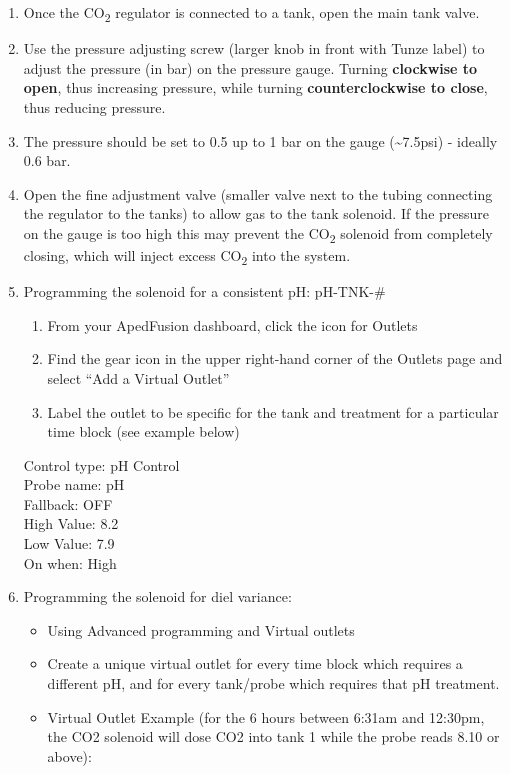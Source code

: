 \documentclass[
]{book}
\providecommand{\tightlist}{%
  \setlength{\itemsep}{0pt}\setlength{\parskip}{0pt}}
\begin{document}
\begin{enumerate}
\def\labelenumi{\arabic{enumi}.}
\item
  Once the CO\textsubscript{2} regulator is connected to a tank, open the main tank valve.
\item
  Use the pressure adjusting screw (larger knob in front with Tunze label) to adjust the pressure (in bar) on the pressure gauge. Turning \textbf{clockwise to open}, thus increasing pressure, while turning \textbf{counterclockwise to close}, thus reducing pressure.
\item
  The pressure should be set to 0.5 up to 1 bar on the gauge (\textasciitilde7.5psi) - ideally 0.6 bar.
\item
  Open the fine adjustment valve (smaller valve next to the tubing connecting the regulator to the tanks) to allow gas to the tank solenoid. If the pressure on the gauge is too high this may prevent the CO\textsubscript{2} solenoid from completely closing, which will inject excess CO\textsubscript{2} into the system.
\item
  Programming the solenoid for a consistent pH: pH-TNK-\#

  \begin{enumerate}
  \def\labelenumii{\arabic{enumii}.}
  \tightlist
  \item
    From your ApedFusion dashboard, click the icon for Outlets
  \item
    Find the gear icon in the upper right-hand corner of the Outlets page and select ``Add a Virtual Outlet''
  \item
    Label the outlet to be specific for the tank and treatment for a particular time block (see example below)
  \end{enumerate}

  Control type: pH Control\\
  Probe name: pH\\
  Fallback: OFF\\
  High Value: 8.2\\
  Low Value: 7.9\\
  On when: High
\item
  Programming the solenoid for diel variance:

  \begin{itemize}
  \tightlist
  \item
    Using Advanced programming and Virtual outlets
  \item
    Create a unique virtual outlet for every time block which requires a different pH, and for every tank/probe which requires that pH treatment.
  \item
    Virtual Outlet Example (for the 6 hours between 6:31am and 12:30pm, the CO2 solenoid will dose CO2 into tank 1 while the probe reads 8.10 or above):
  \end{itemize}


\end{enumerate}
\end{document}
